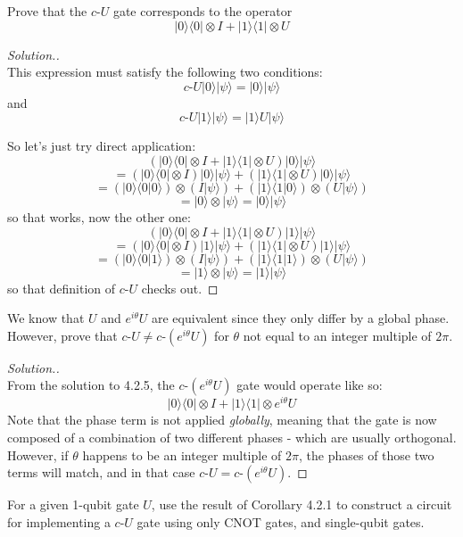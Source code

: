 \documentclass[12pt]{article}
\newenvironment{problem}[2][Problem]{\begin{trivlist}
\item[\hskip \labelsep {\bfseries #1}\hskip \labelsep {\bfseries #2.}]}{\end{trivlist}}
\begin{document}
\begin{problem}{4.2.5}
Prove that the $c$-$U$ gate corresponds to the operator
$$|0\rangle\langle0|\otimes I+|1\rangle\langle1|\otimes U$$
\end{problem}

\begin{proof}[Solution.]~\\
This expression must satisfy the following two conditions:
$$c\text{-}U|0\rangle|\psi\rangle=|0\rangle|\psi\rangle$$
\centering and
$$c\text{-}U|1\rangle|\psi\rangle=|1\rangle U|\psi\rangle$$
\raggedright So let's just try direct application:
$$(|0\rangle\langle0|\otimes I+|1\rangle\langle1|\otimes
U)|0\rangle|\psi\rangle$$
$$=(|0\rangle\langle0|\otimes I)|0\rangle|\psi\rangle+(|1\rangle\langle1|\otimes U)|0\rangle|\psi\rangle$$
$$=(|0\rangle\langle0|0\rangle)\otimes(I|\psi\rangle)+(|1\rangle\langle1|0\rangle)\otimes(U|\psi\rangle)$$
$$=|0\rangle\otimes|\psi\rangle=|0\rangle|\psi\rangle$$
so that works, now the other one:
$$(|0\rangle\langle0|\otimes I+|1\rangle\langle1|\otimes
U)|1\rangle|\psi\rangle$$
$$=(|0\rangle\langle0|\otimes I)|1\rangle|\psi\rangle+(|1\rangle\langle1|\otimes U)|1\rangle|\psi\rangle$$
$$=(|0\rangle\langle0|1\rangle)\otimes(I|\psi\rangle)+(|1\rangle\langle1|1\rangle)\otimes(U|\psi\rangle)$$
$$=|1\rangle\otimes|\psi\rangle=|1\rangle|\psi\rangle$$
so that definition of $c$-$U$ checks out.
\end{proof}

\begin{problem}{4.2.6}
We know that $U$ and $e^{i\theta}U$ are equivalent since they only differ
by a global phase. However, prove that $c$-$U\neq c$-$(e^{i\theta}U)$ for
$\theta$ not equal to an integer multiple of $2\pi$.
\end{problem}

\begin{proof}[Solution.]~\\
From the solution to 4.2.5, the $c$-$(e^{i\theta}U)$ gate would operate
like so:
$$|0\rangle\langle0|\otimes I+|1\rangle\langle1|\otimes e^{i\theta}U$$
Note that the phase term is not applied \emph{globally}, meaning that the
gate is now composed of a combination of two different phases - which are
usually orthogonal. However, if
$\theta$ happens to be an integer multiple of $2\pi$, the phases of those
two terms will match, and in that case $c$-$U=c$-$(e^{i\theta}U)$.
\end{proof}

\begin{problem}{4.2.7}
For a given 1-qubit gate $U$, use the result of Corollary 4.2.1 to
construct a circuit for implementing a $c$-$U$ gate using only CNOT gates,
and single-qubit gates.
\end{problem}
\end{document}
